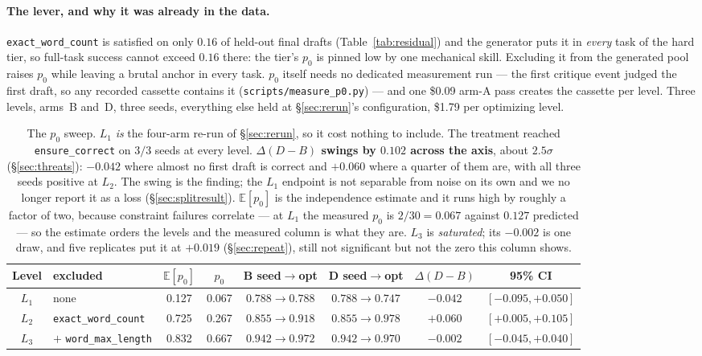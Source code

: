 \documentclass[11pt]{article}
\newcommand{\dd}{\ensuremath{\Delta}}
\begin{document}
\paragraph{The lever, and why it was already in the data.}
\texttt{exact\_word\_count} is satisfied on only $0.16$ of held-out final drafts
(Table~\ref{tab:residual}) and the generator puts it in \emph{every} task of the hard tier, so
full-task success cannot exceed $0.16$ there: the tier's $p_0$ is pinned low by one mechanical
skill. Excluding it from the generated pool raises $p_0$ while leaving a brutal anchor in every
task. $p_0$ itself needs no dedicated measurement run --- the first critique event judged the
first draft, so any recorded cassette contains it
(\texttt{scripts/measure\_p0.py}) --- and one \$0.09 arm-A pass creates the cassette per level.
Three levels, arms~B and~D, three seeds, everything else held at \S\ref{sec:rerun}'s
configuration, \$1.79 per optimizing level.

\begin{table}[h]
\centering
\footnotesize
\begin{tabular}{clcccccc}
\toprule
Level & excluded & $\mathbb{E}[p_0]$ & $p_0$ & B seed$\to$opt & D seed$\to$opt & $\dd(D-B)$ & 95\% CI \\
\midrule
$L_1$ & none & 0.127 & 0.067 & $0.788 \to 0.788$ & $0.788 \to 0.747$ & $\mathbf{-0.042}$ & $[-0.095,+0.050]$ \\
$L_2$ & \texttt{exact\_word\_count} & 0.725 & 0.267 & $0.855 \to 0.918$ & $0.855 \to 0.978$ & $\mathbf{+0.060}$ & $[+0.005,+0.105]$ \\
$L_3$ & $+$ \texttt{word\_max\_length} & 0.832 & 0.667 & $0.942 \to 0.972$ & $0.942 \to 0.970$ & $-0.002$ & $[-0.045,+0.040]$ \\
\bottomrule
\end{tabular}
\caption{The $p_0$ sweep. $L_1$ \emph{is} the four-arm re-run of \S\ref{sec:rerun}, so it cost
nothing to include. The treatment reached \texttt{ensure\_correct} on $3/3$ seeds at every
level. \textbf{$\dd(D-B)$ swings by $0.102$ across the axis}, about $2.5\sigma$
(\S\ref{sec:threats}): $-0.042$ where almost no first draft is correct and $+0.060$ where a
quarter of them are, with all three seeds positive at $L_2$. The swing is the finding; the
$L_1$ endpoint is not separable from noise on its own and we no longer report it as a loss
(\S\ref{sec:splitresult}). $\mathbb{E}[p_0]$ is the independence estimate and it runs high by
roughly a factor of two, because constraint failures correlate --- at $L_1$ the measured $p_0$
is $2/30 = 0.067$ against $0.127$ predicted --- so the estimate orders the levels and the
measured column is what they are. $L_3$ is \emph{saturated}; its $-0.002$ is one draw, and five replicates put it at $+0.019$ (\S\ref{sec:repeat}), still not significant but not the zero this column shows.}
\label{tab:p0}
\end{table}
\end{document}
